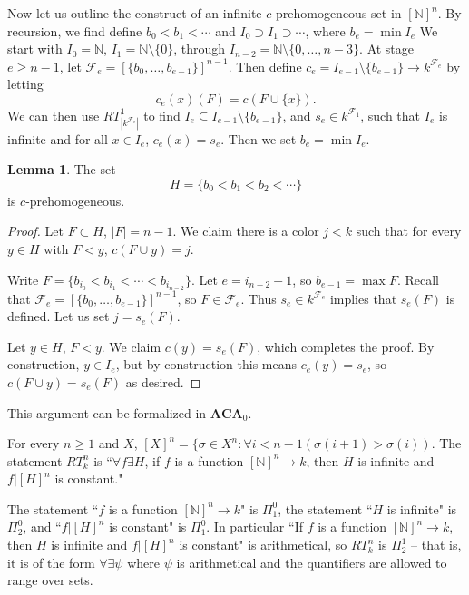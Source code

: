 \documentclass[12pt]{book}
\newcommand{\NN}{\mathbb{N}}
\newcommand{\ACA}{\mathbf{ACA}}
\newcommand{\RCA}{\mathbf{RCA}}
\theoremstyle{definition}
\newtheorem{lemma}[theorem]{Lemma}
\newenvironment{definition}
  {\pushQED{\qed}\renewcommand{\qedsymbol}{$\diamondsuit$}\definitionx}
  {\popQED\endexamplex}
\begin{document}
Now let us outline the construct of an infinite $c$-prehomogeneous set in $[\NN]^n$.
By recursion, we find define $b_0 < b_1 < \cdots$ and $I_0 \supset I_1 \supset \cdots$, where $b_e = \min I_e$
We start with $I_0 = \NN$, $I_1 = \NN \setminus \{0\}$, through $I_{n-2} = \NN \setminus \{0, \dots, n - 3\}$.
At stage $e \geq n - 1$, let $\mathscr F_e = [\{b_0, \dots, b_{e-1}\}]^{n-1}$.
Then define $c_e = I_{e-1} \setminus \{b_{e-1}\} \to k^{\mathscr F_e}$ by letting
$$c_e(x)(F) = c(F \cup \{x\}).$$
We can then use $RT^1_{|k^{\mathscr F_e}|}$ to find $I_e \subseteq I_{e-1} \setminus \{b_{e-1}\}$, and $s_e \in k^{\mathscr F_1}$, such that $I_e$ is infinite and for all $x \in I_e$, $c_e(x) = s_e$.
Then we set $b_e = \min I_e$.

\begin{lemma}
The set
$$H = \{b_0 < b_1 < b_2 < \cdots\}$$
is $c$-prehomogeneous.
\end{lemma}
\begin{proof}
Let $F \subset H$, $|F| = n - 1$.
We claim there is a color $j < k$ such that for every $y \in H$ with $F < y$, $c(F \cup y) = j$.

Write $F = \{b_{i_0} < b_{i_1} < \cdots < b_{i_{n-2}}\}$.
Let $e = i_{n-2} + 1$, so $b_{e-1} = \max F$.
Recall that $\mathscr F_e = [\{b_0, \dots, b_{e-1}\}]^{n-1}$, so $F \in \mathscr F_e$.
Thus $s_e \in k^{\mathscr F_e}$ implies that $s_e(F)$ is defined.
Let us set $j = s_e(F)$.

Let $y \in H$, $F < y$.
We claim $c(y) = s_e(F)$, which completes the proof.
By construction, $y \in I_e$, but by construction this means $c_e(y) = s_e$, so $c(F \cup y) = s_e(F)$ as desired.
\end{proof}

This argument can be formalized in $\ACA_0$.

\begin{definition}[$\RCA_0$]
For every $n \geq 1$ and $X$, $[X]^n = \{\sigma \in X^n: \forall i < n - 1(\sigma(i+1) > \sigma(i))$.
The statement $RT_k^n$ is ``$\forall f \exists H$, if $f$ is a function $[\NN]^n \to k$, then $H$ is infinite and $f|[H]^n$ is constant."
\end{definition}

The statement ``$f$ is a function $[\NN]^n \to k$" is $\Pi_1^0$, the statement ``$H$ is infinite" is $\Pi_2^0$, and ``$f|[H]^n$ is constant" is $\Pi_1^0$.
In particular ``If $f$ is a function $[\NN]^n \to k$, then $H$ is infinite and $f|[H]^n$ is constant" is arithmetical, so $RT_k^n$ is $\Pi_2^1$ -- that is, it is of the form $\forall\exists\psi$ where $\psi$ is arithmetical and the quantifiers are allowed to range over sets.
\end{document}
